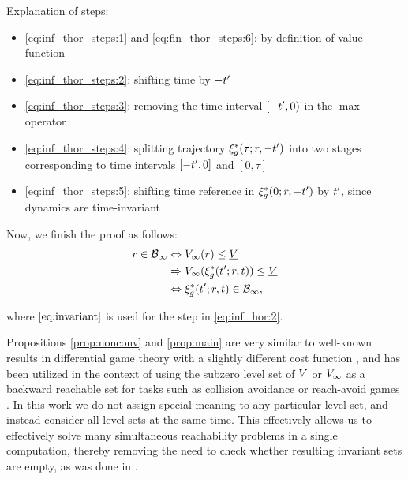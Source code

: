 \begin{IEEEproof}
Explanation of steps:
\begin{itemize}
  \item \eqref{eq:inf_thor_steps:1} and \eqref{eq:fin_thor_steps:6}: by definition of value function
  \item \eqref{eq:inf_thor_steps:2}: shifting time by $-t'$
  \item \eqref{eq:inf_thor_steps:3}: removing the time interval $[-t',0)$ in the $\max$ operator
  \item \eqref{eq:inf_thor_steps:4}: splitting trajectory $\xi_g^*(\tau; r, -t')$ into two stages corresponding to time intervals $[-t', 0]$ and $[0, \tau]$
  \item \eqref{eq:inf_thor_steps:5}: shifting time reference in $\xi_g^*(0; r, -t')$ by $t'$, since dynamics are time-invariant
\end{itemize}

Now, we finish the proof as follows:
\begin{subequations} \label{eq:inf_hor}
  \begin{align}
  \rstate \in \TEB_\infty &\Leftrightarrow \valfunc_\infty(\rstate) \le \underline\valfunc \\
  & \Rightarrow \valfunc_\infty(\rtraj^*(\tvar'; \rstate, \tvar)) \le \underline\valfunc \label{eq:inf_hor:2}\\
  & \Leftrightarrow \rtraj^*(\tvar'; \rstate, \tvar) \in \TEB_\infty,
  \end{align}
\end{subequations}

\noindent where $\eqref{eq:invariant}$ is used for the step in \eqref{eq:inf_hor:2}.

\end{IEEEproof} 
 \begin{rem} 
   Propositions \ref{prop:nonconv} and \ref{prop:main} are very similar to well-known results in differential game theory with a slightly different cost function \cite{Akametalu2014}, and has been utilized in the context of using the subzero level set of $V$ or $V_\infty$ as a backward reachable set for tasks such as collision avoidance or reach-avoid games \cite{Mitchell05}. In this work we do not assign special meaning to any particular level set, and instead consider all level sets at the same time. This effectively allows us to effectively solve many simultaneous reachability problems in a single computation, thereby removing the need to check whether resulting invariant sets are empty, as was done in \cite{Bansal2017}.
 \end{rem}